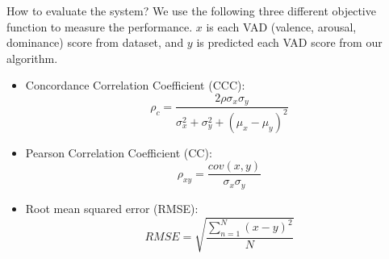 \documentclass[aspectratio=169]{beamer}
\begin{document}
\begin{frame}[t, fragile]{How to evaluate the system?}
We use the following three different objective function to measure the performance.
$x$ is each VAD (valence, arousal, dominance) score from dataset, 
and $y$ is predicted each VAD score from our algorithm.

\begin{itemize}
\item Concordance Correlation Coefficient (CCC): 
\begin{equation}
	\rho_c = \dfrac{2\rho \sigma_x \sigma_y}
			{\sigma_x^2 + \sigma_y^2 + (\mu_x - \mu_y)^2}
\label{eq:ccc}
\end{equation}
\item Pearson Correlation Coefficient (CC):
\begin{equation}
    \rho_{xy} = \dfrac {cov(x, y)}{\sigma_x \sigma_y}
    \label{eq:cc}
\end{equation}
\item Root mean squared error (RMSE):
\begin{equation}
    RMSE = \sqrt{\dfrac{\sum_{n=1}^{N} (x-y)^2}{N}}
\label{eq:rmse}
\end{equation}
\end{itemize}
\end{frame}

\end{document}
